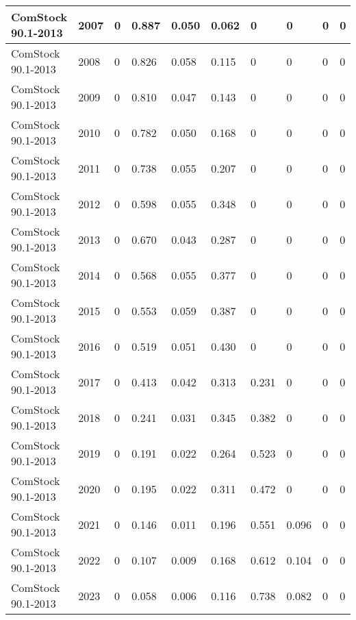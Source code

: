\begin{table}
\begin{tabular}{|l|l|l|l|l|l|l|l|l|l|}
ComStock 90.1-2013 & 2007      & 0 & 0.887 & 0.050 & 0.062     & 0        & 0        & 0        & 0        \\ \hline
ComStock 90.1-2013 & 2008      & 0 & 0.826 & 0.058 & 0.115     & 0        & 0        & 0        & 0        \\ \hline
ComStock 90.1-2013 & 2009      & 0 & 0.810 & 0.047 & 0.143     & 0        & 0        & 0        & 0        \\ \hline
ComStock 90.1-2013 & 2010      & 0 & 0.782 & 0.050 & 0.168     & 0        & 0        & 0        & 0        \\ \hline
ComStock 90.1-2013 & 2011      & 0 & 0.738 & 0.055 & 0.207     & 0        & 0        & 0        & 0        \\ \hline
ComStock 90.1-2013 & 2012      & 0 & 0.598 & 0.055 & 0.348     & 0        & 0        & 0        & 0        \\ \hline
ComStock 90.1-2013 & 2013      & 0 & 0.670 & 0.043 & 0.287     & 0        & 0        & 0        & 0        \\ \hline
ComStock 90.1-2013 & 2014      & 0 & 0.568 & 0.055 & 0.377     & 0        & 0        & 0        & 0        \\ \hline
ComStock 90.1-2013 & 2015      & 0 & 0.553 & 0.059 & 0.387     & 0        & 0        & 0        & 0        \\ \hline
ComStock 90.1-2013 & 2016      & 0 & 0.519 & 0.051 & 0.430     & 0        & 0        & 0        & 0        \\ \hline
ComStock 90.1-2013 & 2017      & 0 & 0.413 & 0.042 & 0.313     & 0.231    & 0        & 0        & 0        \\ \hline
ComStock 90.1-2013 & 2018      & 0 & 0.241 & 0.031 & 0.345     & 0.382    & 0        & 0        & 0        \\ \hline
ComStock 90.1-2013 & 2019      & 0 & 0.191 & 0.022 & 0.264     & 0.523    & 0        & 0        & 0        \\ \hline
ComStock 90.1-2013 & 2020      & 0 & 0.195 & 0.022 & 0.311     & 0.472    & 0        & 0        & 0        \\ \hline
ComStock 90.1-2013 & 2021      & 0 & 0.146 & 0.011 & 0.196     & 0.551    & 0.096    & 0        & 0        \\ \hline
ComStock 90.1-2013 & 2022      & 0 & 0.107 & 0.009 & 0.168     & 0.612    & 0.104    & 0        & 0        \\ \hline
ComStock 90.1-2013 & 2023      & 0 & 0.058 & 0.006 & 0.116     & 0.738    & 0.082    & 0        & 0        \\ \hline

\end{tabular}
\end{table}
